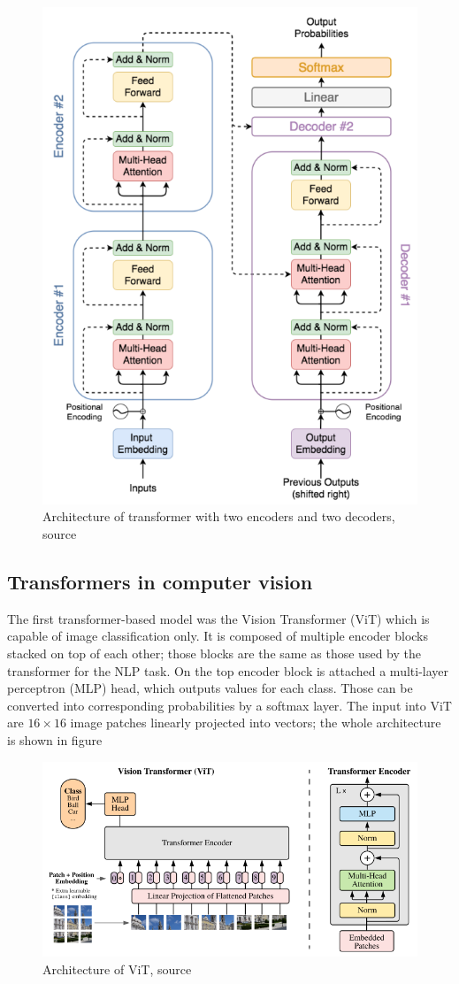 \begin{figure}
    \centering
    \includegraphics[width=0.5\linewidth]{images/two_layer_transformer.png}
    \caption{Architecture of transformer with two encoders and two decoders, source \cite{Yin2020}}
    \label{fig:nlp_transformer}
\end{figure}

\subsection{Transformers in computer vision}
The first transformer-based model was the Vision Transformer (ViT) which is capable of image classification only. It is composed of multiple encoder blocks stacked on top of each other; those blocks are the same as those used by the transformer for the NLP task. On the top encoder block is attached a multi-layer perceptron (MLP) head, which outputs values for each class. Those can be converted into corresponding probabilities by a softmax layer. The input into ViT are $16 \times 16$ image patches linearly projected into vectors; the whole architecture is shown in figure
\begin{figure}
    \centering
    \includegraphics[width=\linewidth]{images/vision_transformer.png}
    \caption{Architecture of ViT, source \cite{Dosovitskiy2020}}
    \label{fig:vision_transformer}
\end{figure}


